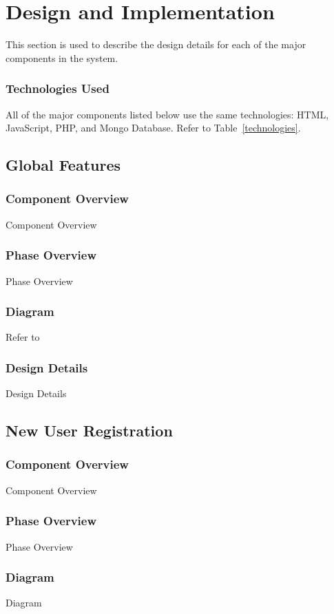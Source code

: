 
\chapter{Design  and Implementation}
This section is used to describe the design details for each of the major components 
in the system.    

\subsection{Technologies  Used}
All of the major components listed below use the same technologies: HTML, JavaScript, PHP, and Mongo Database. Refer to Table~\ref{technologies}.

\section{Global Features }

\subsection{Component  Overview}
Component Overview
\subsection{Phase Overview}
Phase Overview
\subsection{Diagram}
Refer to 
\subsection{Design Details}
Design Details

\section{New User Registration }

\subsection{Component  Overview}
Component Overview
\subsection{Phase Overview}
Phase Overview
\subsection{Diagram}
Diagram
